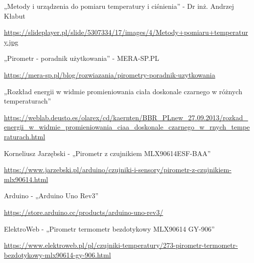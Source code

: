 \cleardoublepage
{}
{}
\begin{thebibliography}{999}
\begin{spacing}{1}


    





    

     „Metody i urządzenia do pomiaru temperatury i ciśnienia” - Dr inż. Andrzej Kłabut

    \url{https://slideplayer.pl/slide/5307334/17/images/4/Metody+pomiaru+temperatury.jpg}

     „Pirometr - poradnik użytkowania” - MERA-SP.PL

    \url{https://mera-sp.pl/blog/rozwiazania/pirometry-poradnik-uzytkowania}

     „Rozkład energii w widmie promieniowania ciała doskonale czarnego w różnych temperaturach”

    \url{https://weblab.deusto.es/olarex/cd/kaernten/BBR_PLnew_27.09.2013/rozkad_energii_w_widmie_promieniowania_ciaa_doskonale_czarnego_w_rnych_temperaturach.html}

     Korneliusz Jarzębski - „Pirometr z czujnikiem MLX90614ESF-BAA”

    \url{https://www.jarzebski.pl/arduino/czujniki-i-sensory/pirometr-z-czujnikiem-mlx90614.html}

     Arduino - „Arduino Uno Rev3”

    \url{https://store.arduino.cc/products/arduino-uno-rev3/}

      ElektroWeb - „Pirometr termometr bezdotykowy MLX90614 GY-906”
    
    \url{https://www.elektroweb.pl/pl/czujniki-temperatury/273-pirometr-termometr-bezdotykowy-mlx90614-gy-906.html}

\end{spacing}
\end{thebibliography}